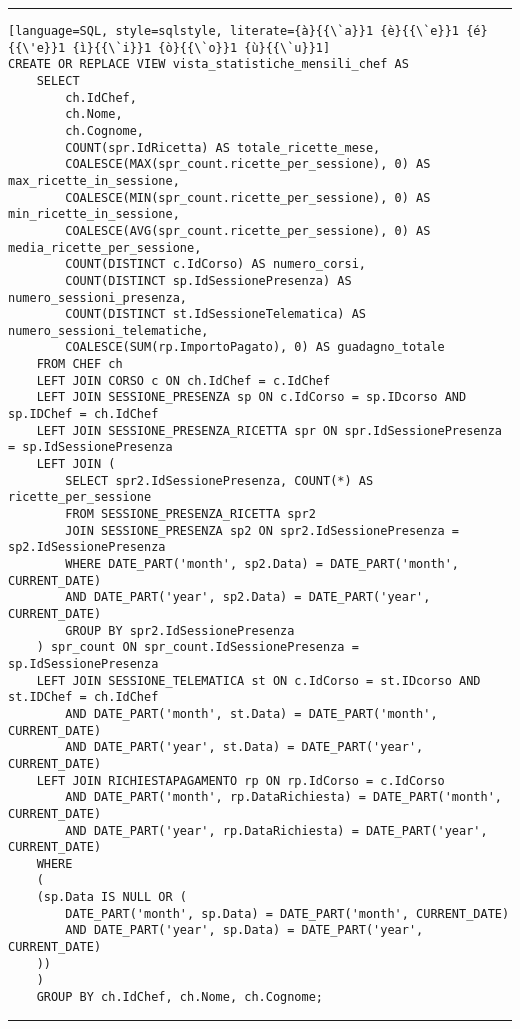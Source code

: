 \noindent\rule{\textwidth}{0.4pt}
\begin{lstlisting}[language=SQL, style=sqlstyle, literate={à}{{\`a}}1 {è}{{\`e}}1 {é}{{\'e}}1 {ì}{{\`i}}1 {ò}{{\`o}}1 {ù}{{\`u}}1]
CREATE OR REPLACE VIEW vista_statistiche_mensili_chef AS
    SELECT
        ch.IdChef,
        ch.Nome,
        ch.Cognome,
        COUNT(spr.IdRicetta) AS totale_ricette_mese,
        COALESCE(MAX(spr_count.ricette_per_sessione), 0) AS max_ricette_in_sessione,
        COALESCE(MIN(spr_count.ricette_per_sessione), 0) AS min_ricette_in_sessione,
        COALESCE(AVG(spr_count.ricette_per_sessione), 0) AS media_ricette_per_sessione,
        COUNT(DISTINCT c.IdCorso) AS numero_corsi,
        COUNT(DISTINCT sp.IdSessionePresenza) AS numero_sessioni_presenza,
        COUNT(DISTINCT st.IdSessioneTelematica) AS numero_sessioni_telematiche,
        COALESCE(SUM(rp.ImportoPagato), 0) AS guadagno_totale
    FROM CHEF ch
    LEFT JOIN CORSO c ON ch.IdChef = c.IdChef
    LEFT JOIN SESSIONE_PRESENZA sp ON c.IdCorso = sp.IDcorso AND sp.IDChef = ch.IdChef
    LEFT JOIN SESSIONE_PRESENZA_RICETTA spr ON spr.IdSessionePresenza = sp.IdSessionePresenza
    LEFT JOIN (
        SELECT spr2.IdSessionePresenza, COUNT(*) AS ricette_per_sessione
        FROM SESSIONE_PRESENZA_RICETTA spr2
        JOIN SESSIONE_PRESENZA sp2 ON spr2.IdSessionePresenza = sp2.IdSessionePresenza
        WHERE DATE_PART('month', sp2.Data) = DATE_PART('month', CURRENT_DATE)
        AND DATE_PART('year', sp2.Data) = DATE_PART('year', CURRENT_DATE)
        GROUP BY spr2.IdSessionePresenza
    ) spr_count ON spr_count.IdSessionePresenza = sp.IdSessionePresenza
    LEFT JOIN SESSIONE_TELEMATICA st ON c.IdCorso = st.IDcorso AND st.IDChef = ch.IdChef
        AND DATE_PART('month', st.Data) = DATE_PART('month', CURRENT_DATE)
        AND DATE_PART('year', st.Data) = DATE_PART('year', CURRENT_DATE)
    LEFT JOIN RICHIESTAPAGAMENTO rp ON rp.IdCorso = c.IdCorso
        AND DATE_PART('month', rp.DataRichiesta) = DATE_PART('month', CURRENT_DATE)
        AND DATE_PART('year', rp.DataRichiesta) = DATE_PART('year', CURRENT_DATE)
    WHERE
    (
    (sp.Data IS NULL OR (
        DATE_PART('month', sp.Data) = DATE_PART('month', CURRENT_DATE)
        AND DATE_PART('year', sp.Data) = DATE_PART('year', CURRENT_DATE)
    ))
    )
    GROUP BY ch.IdChef, ch.Nome, ch.Cognome;
\end{lstlisting}
\noindent\rule{\textwidth}{0.4pt}

